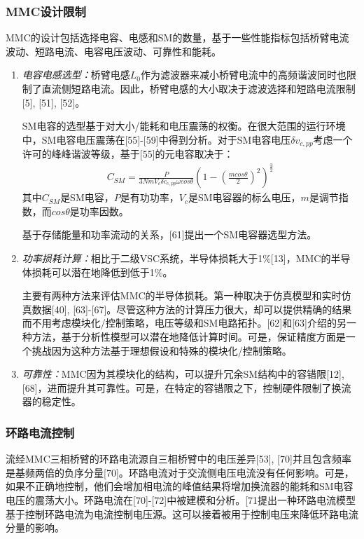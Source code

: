   \subsubsection{MMC设计限制}
  MMC的设计包括选择电容、电感和SM的数量，基于一些性能指标包括桥臂电流波动、短路电流、电容电压波动、可靠性和能耗。
  \begin{enumerate}[1)]
  \item \emph{电容电感选型：}桥臂电感$L_0$作为滤波器来减小桥臂电流中的高频谐波同时也限制了直流侧短路电流。因此，桥臂电感的大小取决于滤波选择和短路电流限制[5], [51], [52]。
  
  SM电容的选型基于对大小/能耗和电压震荡的权衡。在很大范围的运行环境中，SM电容电压震荡在[55]-[59]中得到分析。对于SM电容电压$\delta v_{c, pp}$考虑一个许可的峰峰谐波等级，基于[55]的元电容取决于：
\begin{align*}
C_{SM} = \frac{P}{3NmV_c\delta c_{c, pp}\omega cos\theta}(1-(\frac{mcos\theta}{2})^2)^{\frac{3}{2}}\tag{15}
\end{align*}
其中$C_{SM}$是SM电容，$P$是有功功率，$V_c$是SM电容器的标么电压，$m$是调节指数，而$cos\theta$是功率因数。

  基于存储能量和功率流动的关系，[61]提出一个SM电容器选型方法。
  \item \emph{功率损耗计算：}相比于二级VSC系统，半导体损耗大于1\%[13]，MMC的半导体损耗可以潜在地降低到低于1\%。
  
  主要有两种方法来评估MMC的半导体损耗。第一种取决于仿真模型和实时仿真数据[40], [63]-[67]。尽管这种方法的计算压力很大，却可以提供精确的结果而不用考虑模块化/控制策略，电压等级和SM电路拓扑。[62]和[63]介绍的另一种方法，基于分析性模型可以潜在地降低计算时间。可是，保证精度方面是一个挑战因为这种方法基于理想假设和特殊的模块化/控制策略。
  \item \emph{可靠性：}MMC因为其模块化的结构，可以提升冗余SM结构中的容错限[12], [68]，进而提升其可靠性。可是，在特定的容错限之下，控制硬件限制了换流器的稳定性。
  \end{enumerate}
  
  \subsubsection{环路电流控制}
  
  流经MMC三相桥臂的环路电流源自三相桥臂中的电压差异[53], [70]并且包含频率是基频两倍的负序分量[70]。环路电流对于交流侧电压电流没有任何影响。可是，如果不正确地控制，他们会增加相电流的峰值结果将增加换流器的能耗和SM电容电压的震荡大小。环路电流在[70]-[72]中被建模和分析。[71提出一种环路电流模型基于控制环路电流为电流控制电压源。这可以接着被用于控制电压来降低环路电流分量的影响。
  
